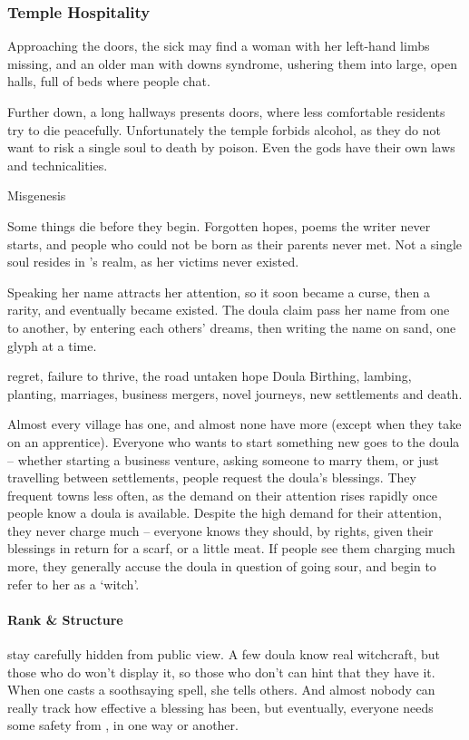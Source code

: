 \begin{multicols}{2}
\subsubsection{Temple Hospitality}
Approaching the doors, the sick may find a woman with her left-hand limbs missing, and an older man with downs syndrome, ushering them into large, open halls, full of beds where people chat.

Further down, a long hallways presents doors, where less comfortable residents try to die peacefully.
Unfortunately the temple forbids alcohol, as they do not want to risk a single soul to death by poison.
Even the gods have their own laws and technicalities.

\guild[\decosix]{\hphantom{Nemo}}%
  {Misgenesis}%
  {
  Some things die before they begin.
  Forgotten hopes, poems the writer never starts, and people who could not be born as their parents never met.
  Not a single soul resides in \hphantom{Nemo}'s realm, as her victims never existed.

  Speaking her name attracts her attention, so it soon became a curse, then a rarity, and eventually became existed.
  The doula claim pass her name from one to another, by entering each others' dreams, then writing the name on sand, one glyph at a time.
  }%
  {regret, failure to thrive, the road untaken}%
  {hope}%
  {Doula}%
  {
    Birthing, lambing, planting, marriages, business mergers, novel journeys, new settlements and death.
  }%

  Almost every village has one, and almost none have more (except when they take on an apprentice).
  Everyone who wants to start something new goes to the doula -- whether starting a business venture, asking someone to marry them, or just travelling between settlements, people request the doula's blessings.
  They frequent towns less often, as the demand on their attention rises rapidly once people know a doula is available.
  Despite the high demand for their attention, they never charge much -- everyone knows they should, by rights, given their blessings in return for a scarf, or a little meat.
  If people see them charging much more, they generally accuse the doula in question of going sour, and begin to refer to her as a `witch'.

  \paragraph{Rank \& Structure}
  stay carefully hidden from public view.
  A few doula know real witchcraft, but those who do won't display it, so those who don't can hint that they have it.
  When one casts a soothsaying spell, she tells others.
  And almost nobody can really track how effective a blessing has been, but eventually, everyone needs some safety from \hphantom{Nemo}, in one way or another.


\end{multicols}
